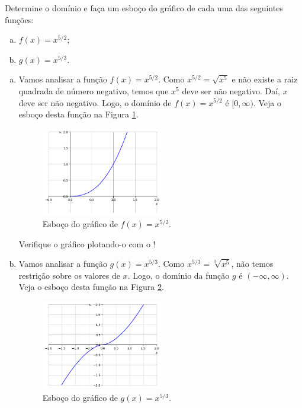 \begin{exeresol}\label{exeresol:funpot_graf}
  Determine o domínio e faça um esboço do gráfico de cada uma das seguintes funções:
  \begin{enumerate}[a)]
  \item $\displaystyle f(x) = x^{5/2}$;
  \item $\displaystyle g(x) = x^{5/3}$.
  \end{enumerate}
\end{exeresol}
\begin{resol}
  \begin{enumerate}[a)]
  \item Vamos analisar a função $f(x) = x^{5/2}$. Como $x^{5/2} = \sqrt{x^5}$ e não existe a raiz quadrada de número negativo, temos que $x^5$ deve ser não negativo. Daí, $x$ deve ser não negativo. Logo, o domínio de $f(x) = x^{5/2}$ é $[0, \infty)$. Veja o esboço desta função na Figura \ref{fig:exeresol_funpot_graf_a}.

    \begin{figure}[H]
      \centering
      \includegraphics[width=0.5\textwidth]{./cap_funcao/dados/fig_exeresol_funpot_graf/fig_exeresol_funpot_graf_a}
      \caption{Esboço do gráfico de $f(x) = x^{5/2}$.}
      \label{fig:exeresol_funpot_graf_a}
    \end{figure}

    \ifispython
    Verifique o gráfico plotando-o com o {\sympy}!
    \fi
  \item Vamos analisar a função $g(x) = x^{5/3}$. Como $x^{5/3} = \sqrt[3]{x^5}$, não temos restrição sobre os valores de $x$. Logo, o domínio da função $g$ é $(-\infty, \infty)$. Veja o esboço desta função na Figura \ref{fig:exeresol_funpot_graf_b}.
    
    \begin{figure}[H]
      \centering
      \includegraphics[width=0.5\textwidth]{./cap_funcao/dados/fig_exeresol_funpot_graf/fig_exeresol_funpot_graf_b}
      \caption{Esboço do gráfico de $g(x) = x^{5/3}$.}
      \label{fig:exeresol_funpot_graf_b}
    \end{figure}


\end{enumerate}
\end{resol}
